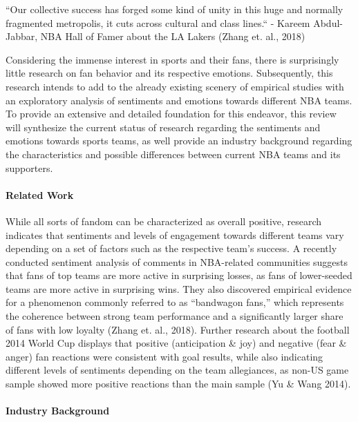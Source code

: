 \documentclass[
]{article}
\begin{document}
``Our collective success has forged some kind of unity in this huge and
normally fragmented metropolis, it cuts across cultural and class
lines.`` - Kareem Abdul-Jabbar, NBA Hall of Famer about the LA Lakers
(Zhang et. al., 2018)

Considering the immense interest in sports and their fans, there is
surprisingly little research on fan behavior and its respective
emotions. Subsequently, this research intends to add to the already
existing scenery of empirical studies with an exploratory analysis of
sentiments and emotions towards different NBA teams. To provide an
extensive and detailed foundation for this endeavor, this review will
synthesize the current status of research regarding the sentiments and
emotions towards sports teams, as well provide an industry background
regarding the characteristics and possible differences between current
NBA teams and its supporters.

\hfill\break

\hypertarget{related-work}{%
\paragraph{Related Work}\label{related-work}}

While all sorts of fandom can be characterized as overall positive,
research indicates that sentiments and levels of engagement towards
different teams vary depending on a set of factors such as the
respective team's success. A recently conducted sentiment analysis of
comments in NBA-related communities suggests that fans of top teams are
more active in surprising losses, as fans of lower-seeded teams are more
active in surprising wins. They also discovered empirical evidence for a
phenomenon commonly referred to as ``bandwagon fans,'' which represents
the coherence between strong team performance and a significantly larger
share of fans with low loyalty (Zhang et. al., 2018). Further research
about the football 2014 World Cup displays that positive (anticipation
\& joy) and negative (fear \& anger) fan reactions were consistent with
goal results, while also indicating different levels of sentiments
depending on the team allegiances, as non-US game sample showed more
positive reactions than the main sample (Yu \& Wang 2014).

\hfill\break

\hypertarget{industry-background}{%
\paragraph{Industry Background}\label{industry-background}}
\end{document}
